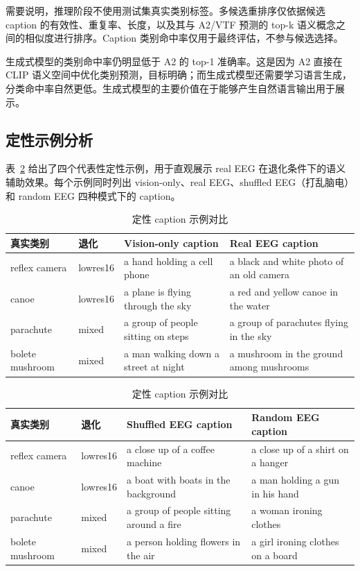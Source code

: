 需要说明，推理阶段不使用测试集真实类别标签。多候选重排序仅依据候选 caption 的有效性、重复率、长度，以及其与 A2/VTF 预测的 top-k 语义概念之间的相似度进行排序。Caption 类别命中率仅用于最终评估，不参与候选选择。

生成式模型的类别命中率仍明显低于 A2 的 top-1 准确率。这是因为 A2 直接在 CLIP 语义空间中优化类别预测，目标明确；而生成式模型还需要学习语言生成，分类命中率自然更低。生成式模型的主要价值在于能够产生自然语言输出用于展示。

\subsection{定性示例分析}

表~\ref{tab:qualitative} 给出了四个代表性定性示例，用于直观展示 real EEG 在退化条件下的语义辅助效果。每个示例同时列出 vision-only、real EEG、shuffled EEG（打乱脑电）和 random EEG 四种模式下的 caption。

\begin{table}[htbp]
  \centering
  \caption{定性 caption 示例对比}
  \label{tab:qualitative}
  \begin{tabularx}{\linewidth}{l l X X}
    \toprule
    真实类别 & 退化 & Vision-only caption & Real EEG caption \\
    \midrule
    reflex camera & lowres16 & a hand holding a cell phone & a black and white photo of an old camera \\
    canoe & lowres16 & a plane is flying through the sky & a red and yellow canoe in the water \\
    parachute & mixed & a group of people sitting on steps & a group of parachutes flying in the sky \\
    bolete mushroom & mixed & a man walking down a street at night & a mushroom in the ground among mushrooms \\
    \bottomrule
  \end{tabularx}

  \vspace{4pt}
  \begin{tabularx}{\linewidth}{l l X X}
    \toprule
    真实类别 & 退化 & Shuffled EEG caption & Random EEG caption \\
    \midrule
    reflex camera & lowres16 & a close up of a coffee machine & a close up of a shirt on a hanger \\
    canoe & lowres16 & a boat with boats in the background & a man holding a gun in his hand \\
    parachute & mixed & a group of people sitting around a fire & a woman ironing clothes \\
    bolete mushroom & mixed & a person holding flowers in the air & a girl ironing clothes on a board \\
    \bottomrule
  \end{tabularx}
\end{table}

